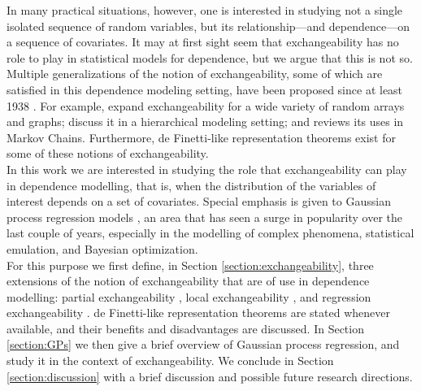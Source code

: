 In many practical situations, however, one is interested in studying not a single isolated sequence of random variables, but its relationship---and dependence---on a sequence of covariates. It may at first sight seem that exchangeability has no role to play in statistical models for dependence, but we argue that this is not so. Multiple generalizations of the notion of exchangeability, some of which are satisfied in this dependence modeling setting, have been proposed since at least 1938 \cite{deFinetti:1938:partial_exch}. For example, \cite{Aldous:2010, Orbanz:Roy:2015} expand exchangeability for a wide variety of random arrays and graphs; \cite{Bernardo:1996:Exch, CamerlenghiEtAl:2019:partial_exchang_hierarchical} discuss it in a hierarchical modeling setting; and \cite{Diaconis:1988:PartialExchang} reviews its uses in Markov Chains. Furthermore, de Finetti-like representation theorems exist for some of these notions of exchangeability. 
\\


In this work we are interested in studying the role that exchangeability can play in dependence modelling, that is, when the distribution of the variables of interest depends on a set of covariates. Special emphasis is given to Gaussian process regression models \cite{RasmussenWilliams:2006}, an area that has seen a surge in popularity over the last couple of years, especially in the modelling of complex phenomena, statistical emulation, and Bayesian optimization.
\\


For this purpose we first define, in Section \ref{section:exchangeability}, three extensions of the notion of exchangeability that are of use in dependence modelling: partial exchangeability \cite{deFinetti:1938:partial_exch}, local exchangeability \cite{CampbellEtAl:2019:LocalExch}, and regression exchangeability \cite{McCullagh:2005:ExchAndReg}. de Finetti-like representation theorems are stated whenever available, and their benefits and disadvantages are discussed. In Section \ref{section:GPs} we then give a brief overview of Gaussian process regression, and study it in the context of exchangeability. We conclude in Section \ref{section:discussion} with a brief discussion and possible future research directions.





